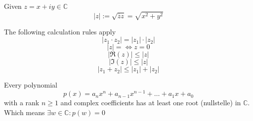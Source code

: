 \begin{definition}
   Given \(z = x + iy \in \mathbb{C}\)
   \[|z| := \sqrt{\overline{z}z} = \sqrt{x^2 + y^2}\]
\end{definition}
\begin{remark}
   The following calculation rules apply
   \[|z_1 \cdot z_2| = |z_1| \cdot |z_2|\]
   \[|z| = \iff z = 0\]
   \[|\Re(z)| \leq |z|\]
   \[|\Im(z)| \leq |z|\]
   \[|z_1 + z_2| \leq |z_1| + |z_2|\]
\end{remark}


\begin{theorem}
   Every polynomial
   \[p(x) = a_nx^n + a_{n-1}x^{n-1} + \ldots + a_1x + a_0\]
   with a rank \(n \geq 1\) and complex coefficients has at least one root (nullstelle) in \(\mathbb{C}\).
   Which means \(\exists w \in \mathbb{C}: p(w) = 0\)
\end{theorem}
